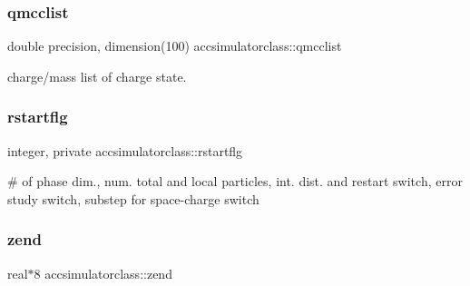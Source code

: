 \subsubsection{\texorpdfstring{qmcclist}{qmcclist}}
{\footnotesize\ttfamily double precision, dimension(100) accsimulatorclass\+::qmcclist}



charge/mass list of charge state. 

\mbox{\label{namespaceaccsimulatorclass_af704d398708fe866be2cd6b2f2705267}} 
\subsubsection{\texorpdfstring{rstartflg}{rstartflg}}
{\footnotesize\ttfamily integer, private accsimulatorclass\+::rstartflg\hspace{0.3cm}{\ttfamily [private]}}



\# of phase dim., num. total and local particles, int. dist. and restart switch, error study switch, substep for space-\/charge switch 

\mbox{\label{namespaceaccsimulatorclass_a36e211bc045925eb053915a15d72ea4f}} 
\subsubsection{\texorpdfstring{zend}{zend}}
{\footnotesize\ttfamily real$\ast$8 accsimulatorclass\+::zend}

